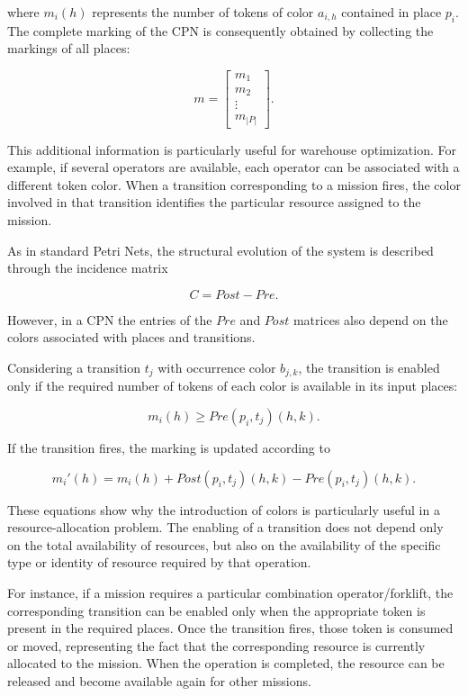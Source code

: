 \noindent where $m_i(h)$ represents the number of tokens of color $a_{i,h}$ contained in
place $p_i$. The complete marking of the CPN is consequently obtained by
collecting the markings of all places:

\[
m =
\begin{bmatrix}
	m_1\\
	m_2\\
	\vdots\\
	m_{|P|}
\end{bmatrix}.
\]

\noindent This additional information is particularly useful for warehouse optimization.
For example, if several operators are available, each operator can be associated
with a different token color. When a transition corresponding to a mission fires,
the color involved in that transition identifies the particular resource assigned
to the mission.

As in standard Petri Nets, the structural evolution of the system is described
through the incidence matrix

\[
C = Post - Pre.
\]

\noindent However, in a CPN the entries of the $Pre$ and $Post$ matrices also depend on the colors associated with places and transitions.

Considering a transition $t_j$ with occurrence color $b_{j,k}$, the transition
is enabled only if the required number of tokens of each color is available in
its input places:

\begin{equation}
	m_i(h) \geq Pre(p_i,t_j)(h,k).
\end{equation}

\noindent If the transition fires, the marking is updated according to

\begin{equation}
	m_i'(h)
	=
	m_i(h)
	+
	Post(p_i,t_j)(h,k)
	-
	Pre(p_i,t_j)(h,k).
\end{equation}

\noindent These equations show why the introduction of colors is particularly useful in a
resource-allocation problem. The enabling of a transition does not depend only
on the total availability of resources, but also on the availability of the
specific type or identity of resource required by that operation.

For instance, if a mission requires a particular combination operator/forklift, the corresponding transition can be enabled only when the appropriate
token is present in the required places. Once the transition fires, those
token is consumed or moved, representing the fact that the corresponding
resource is currently allocated to the mission. When the operation is completed,
the resource can be released and become available again for other missions.

